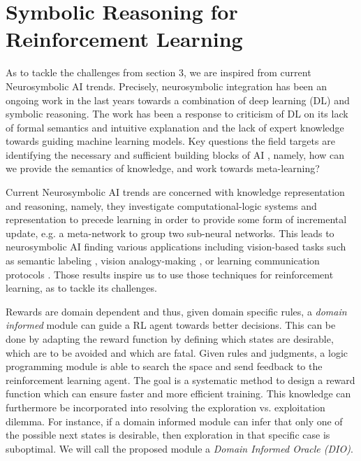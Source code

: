 \documentclass[a4paper,11pt]{article}
\begin{document}
\section{Symbolic Reasoning for Reinforcement Learning} \label{symrl}
As to tackle the challenges from section 3, we are inspired from current Neurosymbolic AI trends. Precisely, neurosymbolic integration has been an ongoing work in the last years towards a combination of deep learning (DL) and symbolic reasoning.
The work has been a response to criticism of DL on its lack of formal semantics and intuitive explanation and the lack of expert knowledge towards guiding machine learning models. 
Key questions the field targets are identifying the necessary and sufficient building blocks of AI \cite{garcez2020neurosymbolic}, namely, how can we provide the semantics of knowledge, 
and work towards meta-learning? 

Current Neurosymbolic AI trends are concerned with knowledge representation and reasoning, namely, they investigate computational-logic systems 
and representation to precede learning in order to provide some form of incremental update, e.g. a meta-network to group two sub-neural networks. \cite{Besold2017NeuralSymbolicLA}
This leads to neurosymbolic AI finding various applications including vision-based tasks such as semantic labeling \cite{vinyals2015, karpathy2015}, 
vision analogy-making \cite{Reed2015DeepVA}, or learning communication protocols \cite{Foerster2016LearningTC}. Those results inspire us to use those techniques for reinforcement learning, as to tackle its challenges.

\medskip
Rewards are domain dependent and thus, given domain specific rules, a \emph{domain informed} module can guide a RL agent towards better decisions. This can be done by 
adapting the reward function by defining which states are desirable, which are to be avoided and which are fatal. Given rules and judgments, a logic programming module 
is able to search the space and send feedback to the reinforcement learning agent. The goal is a systematic method to design a reward function which can ensure faster and more efficient 
training. This knowledge can furthermore be incorporated into resolving the exploration vs. exploitation dilemma. For instance, if a domain informed module 
can infer that only one of the possible next states is desirable, then exploration in that specific case is suboptimal.  
We will call the proposed module a \emph{Domain Informed Oracle (DIO)}. 
\end{document}
